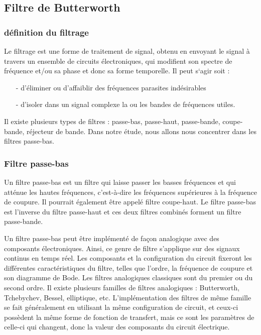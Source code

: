 \documentclass[conference,onecolumn]{IEEEtran}
\begin{document}
\subsection{\textbf{Filtre de Butterworth}}

\subsubsection{définition du filtrage}
\medskip
Le filtrage est une forme de traitement de signal, obtenu en envoyant le signal à travers un ensemble de circuits électroniques, qui modifient son spectre de fréquence et/ou sa phase et donc sa forme temporelle. Il peut s‘agir soit : 

\begin{itemize}
    \item[-] d’éliminer ou d’affaiblir des fréquences parasites indésirables 

    \item[-] d’isoler dans un signal complexe la ou les bandes de fréquences utiles. 
\end{itemize}

Il existe plusieurs types de filtres : passe-bas, passe-haut, passe-bande, coupe-bande, réjecteur de bande. Dans notre étude, nous allons nous concentrer dans les filtres passe-bas.

\medskip
\subsubsection{Filtre passe-bas}
Un filtre passe-bas est un filtre qui laisse passer les basses fréquences et qui atténue les hautes fréquences, c'est-à-dire les fréquences supérieures à la fréquence de coupure. Il pourrait également être appelé filtre coupe-haut. Le filtre passe-bas est l'inverse du filtre passe-haut et ces deux filtres combinés forment un filtre passe-bande. 

Un filtre passe-bas peut être implémenté de façon analogique avec des composants électroniques. Ainsi, ce genre de filtre s'applique sur des signaux continus en temps réel. Les composants et la configuration du circuit fixeront les différentes caractéristiques du filtre, telles que l'ordre, la fréquence de coupure et son diagramme de Bode. Les filtres analogiques classiques sont du premier ou du second ordre. Il existe plusieurs familles de filtres analogiques : Butterworth, Tchebychev, Bessel, elliptique, etc. L'implémentation des filtres de même famille se fait généralement en utilisant la même configuration de circuit, et ceux-ci possèdent la même forme de fonction de transfert, mais ce sont les paramètres de celle-ci qui changent, donc la valeur des composants du circuit électrique.
\medskip
\end{document}
